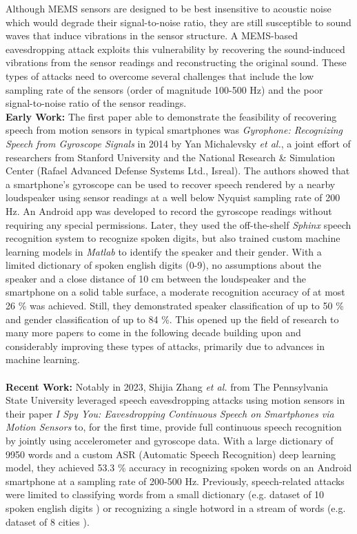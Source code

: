 \documentclass[sigconf, nonacm]{acmart}
\begin{document}
Although MEMS sensors are designed to be best insensitive to acoustic noise which would degrade their signal-to-noise ratio, they are still susceptible to sound waves that induce vibrations in the sensor structure.
A MEMS-based eavesdropping attack exploits this vulnerability by recovering the sound-induced vibrations from the sensor readings and reconstructing the original sound.
These types of attacks need to overcome several challenges that include the low sampling rate of the sensors (order of magnitude 100-500 Hz) and the poor signal-to-noise ratio of the sensor readings.
\\[6pt]
\textbf{Early Work:} The first paper able to demonstrate the feasibility of recovering speech from motion sensors in typical smartphones was \textit{Gyrophone: Recognizing Speech from Gyroscope Signals} \cite{Gyrophone2014} in 2014 by Yan Michalevsky \textit{et al.}, a joint effort of researchers from Stanford University and the National Research \& Simulation Center (Rafael Advanced Defense Systems Ltd., Isreal).
The authors showed that a smartphone's gyroscope can be used to recover speech rendered by a nearby loudspeaker using sensor readings at a well below Nyquist sampling rate of 200 Hz.
An Android app was developed to record the gyroscope readings without requiring any special permissions.
Later, they used the off-the-shelf \textit{Sphinx} speech recognition system to recognize spoken digits, but also trained custom machine learning models in \textit{Matlab} to identify the speaker and their gender.
With a limited dictionary of spoken english digits (0-9), no assumptions about the speaker and a close distance of 10 cm between the loudspeaker and the smartphone on a solid table surface, a moderate recognition accuracy of at most 26 \% was achieved. Still, they demonstrated speaker classification of up to 50 \% and gender classification of up to 84 \%.
This opened up the field of research to many more papers to come in the following decade building upon and considerably improving these types of attacks, primarily due to advances in machine learning.
\\~\\
\textbf{Recent Work:} Notably in 2023, Shijia Zhang \textit{et al.} from The Pennsylvania State University leveraged speech eavesdropping attacks using motion sensors in their paper \textit{I Spy You: Eavesdropping Continuous Speech on Smartphones via Motion Sensors} \cite{ISpyU2023} to, for the first time, provide full continuous speech recognition by jointly using accelerometer and gyroscope data.
With a large dictionary of 9950 words and a custom ASR (Automatic Speech Recognition) deep learning model, they achieved 53.3 \% accuracy in recognizing spoken words on an Android smartphone at a sampling rate of 200-500 Hz.
Previously, speech-related attacks were limited to classifying words from a small dictionary (e.g. dataset of 10 spoken english digits \cite{Gyrophone2014}\cite{Speechless2018}\cite{InertiEAR2022}\cite{VoiceListener2023}) or recognizing a single hotword in a stream of words (e.g. dataset of 8 cities \cite{AccelWorld2015}\cite{AccelEve2020}\cite{Vibphone2021}).
\end{document}
